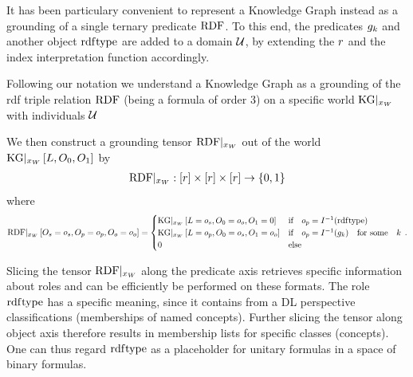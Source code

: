\label{subsec:knowledgeGraphTernaryRep}

It has been particulary convenient to represent a Knowledge Graph instead as a grounding of a single ternary predicate $\mathrm{RDF}$.
To this end, the predicates $g_{k}$ and another object $\mathrm{rdf}\mathrm{type}$ are added to a domain $\mathcal{U}$, by extending the $r$ and the index interpretation function accordingly.


Following our notation we understand a Knowledge Graph as a grounding of the rdf triple relation $\mathrm{RDF}$ (being a formula of order 3) on a specific world $\mathrm{KG}|_{x_{W}}$ with individuals $\mathcal{U}$

We then construct a grounding tensor ${\mathrm{RDF}}|_{x_{W}}$ out of the world $\mathrm{KG}|_{x_{W}}\left[L,O_{0},O_{1}\right]$ by
\begin{align*}
    {\mathrm{RDF}}|_{x_{W}} : [r] \times [r] \times [r] \rightarrow \{0,1\}
\end{align*}
where
\begin{align*}
    {\mathrm{RDF}}|_{x_{W}}\left[O_{s}=o_{s}, O_{p}=o_{p}, O_{o}=o_{o}\right] =
    \begin{cases}
        \mathrm{KG}|_{x_{W}}\left[L=o_{s},O_{0}=o_{o},O_{1}=0\right]
        & \text{if} \quad o_{p} = I^{-1}(\mathrm{rdf}\mathrm{type}) \\
        \mathrm{KG}|_{x_{W}}\left[L=o_{p},O_{0}=o_{s},O_{1}=o_{o}\right]
        & \text{if} \quad o_{p} = I^{-1}(g_{k}) \quad \text{for some} \quad k \\
        0  \quad & \text{else}
    \end{cases} \, .
\end{align*}


Slicing the tensor ${\mathrm{RDF}}|_{x_{W}}$ along the predicate axis retrieves specific information about roles and can be efficiently be performed on these formats.
The role $\mathrm{rdf}\mathrm{type}$ has a specific meaning, since it contains from a DL perspective classifications (memberships of named concepts).
Further slicing the tensor along object axis therefore results in membership lists for specific classes (concepts).
One can thus regard $\mathrm{rdf}\mathrm{type}$ as a placeholder for unitary formulas in a space of binary formulas.

